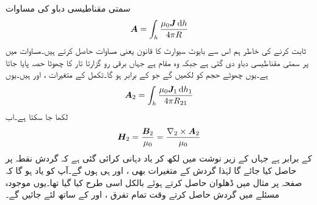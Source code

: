 سمتی مقناطیسی دباو  کی مساوات
\begin{align}\label{مساوات_مقناطیسی_سمتی_مقناطیسی_دباو_حجمی_رو_ب}
\kvec{A}=\int_h \frac{\mu_0 \kvec{J} \dif h}{4\pi R}
\end{align}
ثابت کرنے کی خاطر ہم اس سے بایوٹ سیوارٹ کا قانون یعنی مساوات   حاصل کرتے ہیں۔مساوات  میں  پر سمتی مقناطیسی دباو دی گئی ہے جبکہ  وہ مقام ہے جہاں برقی رو گزارتا تار کا چھوٹا حصہ پایا جاتا ہے۔یوں چھوٹے حجم کو  لکھیں گے جو  کے برابر ہو گا۔تکمل کے متغیرات ،  اور  ہیں۔یوں
\begin{align}\label{مساوات_مقناطیسی_سمتی_مقناطیسی_دباو_دوسرا_نقطہ}
\kvec{A}_2=\int_h \frac{\mu_0 \kvec{J}_1 \dif h_1}{4\pi R_{21}}
\end{align}
لکھا جا سکتا ہے۔اب 
\begin{align*}
{\ensuremath{{\boldsymbol{H}}}}_2=\frac{{{\boldsymbol{B}}}_2}{\mu_0}=\frac{\nabla_2 \times {\ensuremath{{\boldsymbol{A}}}}_2}{\mu_0}
\end{align*}
کے برابر ہے جہاں  کے زیر نوشت میں  لکھ کر یاد دہانی کرائی گئی ہے کہ گردش نقطہ  پر حاصل کیا جائے گا لہٰذا گردش کے متغیرات بھی ،  اور  ہی ہوں گے۔آپ کو یاد ہو گا کہ صفحہ  پر مثال  میں ڈھلوان حاصل کرتے ہوئے بالکل اسی طرح کیا گیا تھا۔یوں موجودہ مسئلے میں گردش حاصل کرتے وقت تمام تفرق ،  اور  کے ساتھ لئے جائیں گے۔

